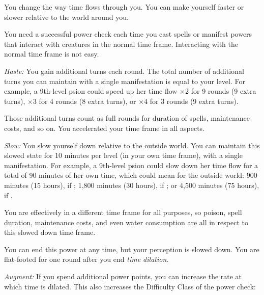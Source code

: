{
	You change the way time flows through you. You can make yourself faster or slower relative to the world around you.

	You need a successful power check each time you cast spells or manifest powers that interact with creatures in the normal time frame. Interacting with the normal time frame is not easy.

	\textit{Haste:} You gain additional turns each round. The total number of additional turns you can maintain with a single manifestation is equal to your level. For example, a 9th-level psion could speed up her time flow $\times2$ for 9 rounds (9 extra turns), $\times3$ for 4 rounds (8 extra turns), or $\times4$ for 3 rounds (9 extra turns).

	Those additional turns count as full rounds for duration of spells, maintenance costs, and so on. You accelerated your time frame in all aspects.

	\textit{Slow:} You slow yourself down relative to the outside world. You can maintain this slowed state for 10 minutes per level (in your own time frame), with a single manifestation. For example, a 9th-level psion could slow down her time flow for a total of 90 minutes of her own time, which could mean for the outside world: 900 minutes (15 hours), if ; 1,800 minutes (30 hours), if ; or 4,500 minutes (75 hours), if .

	You are effectively in a different time frame for all purposes, so poison, spell duration, maintenance costs, and even water consumption are all in respect to this slowed down time frame.

	You can end this power at any time, but your perception is slowed down. You are flat-footed for one round after you end \emph{time dilation}.

	\textit{Augment:} If you spend additional power points, you can increase the rate at which time is dilated. This also increases the Difficulty Class of the power check:

}
